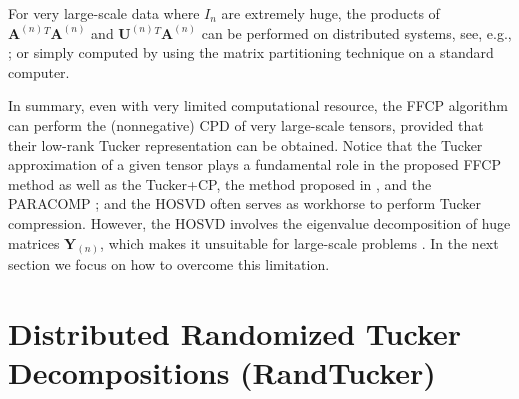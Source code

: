 \documentclass[10pt,twocolumn,twoside]{IEEEtran}
\newcommand{\tenmat}[2][n]{\ensuremath{{\mathbf{#2}}_{(#1)}}}
\newcommand{\matn}[2][n]{\ensuremath{\mathbf{#2}^{(#1)}}}
\begin{document}
For very large-scale data where $I_n$ are extremely huge, the products of $\matn{A}{}^T\matn{A}$ and $\matn{U}{}^T\matn{A}$ can be performed on distributed systems, see, e.g., \cite{distMatProd2012}; or simply computed by using the matrix partitioning technique on a standard computer. 


In summary, even with very limited computational resource, the FFCP algorithm can perform the (nonnegative) CPD of very large-scale tensors, provided that their low-rank Tucker representation can be obtained. Notice that the Tucker approximation of a given tensor plays a fundamental role in the proposed FFCP method as well as the Tucker+CP, the method proposed in \cite{ComonNTF}, and the PARACOMP \cite{paracomp}; and the HOSVD often serves as workhorse to perform Tucker compression. However, the HOSVD involves the eigenvalue decomposition of huge matrices \tenmat{Y}, which makes it unsuitable for large-scale problems \cite{paracomp}.  In the next section we focus on how to overcome this limitation.



\section{Distributed Randomized Tucker Decompositions (RandTucker)}
\label{sec:DRandTucker}
\end{document}
